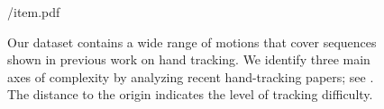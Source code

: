 \begin{figure}[t!]
\centering
\begin{overpic} 
[width=\linewidth]
{\currfiledir/item.pdf}
\end{overpic}
\caption{
% 
Our dataset contains a wide range of motions that cover sequences shown in previous work on hand tracking. We identify three main axes of complexity by analyzing recent hand-tracking papers; see \VideoSpace{}. 
The distance to the origin indicates the level of tracking difficulty.
% 
}
\label{fig:motiontypes}
\end{figure}